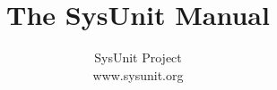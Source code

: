 \documentclass[10pt,oneside,letterpaper]{book}
\begin{document}
\let\footnoterule\hrule

\makeatletter
\renewcommand{\@makefntext}[1]%
	{\noindent\makebox[1.8em][r]{\@makefnmark}#1}
\makeatother

\title{
	The SysUnit Manual
}

\author{
	\textsf{SysUnit Project}\\
	\textsf{www.sysunit.org}\\
}


\frontmatter

\maketitle

\tableofcontents

\listoffigures 



\mainmatter






\appendix




\backmatter


\small
\printindex
\end{document}
